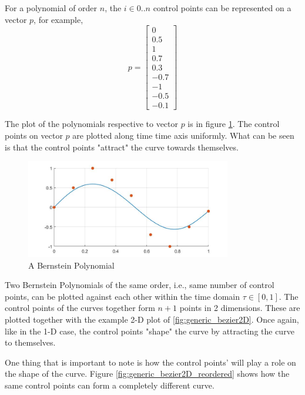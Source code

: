 \par For a polynomial of order $n$, the $i \in {0 .. n}$ control points can be represented on a vector $p$, for example,
\begin{equation}
    p = \begin{bmatrix}0\\ 0.5\\ 1\\ 0.7\\ 0.3\\ -0.7\\ -1\\ -0.5\\ -0.1\end{bmatrix}
\end{equation}
\par The plot of the polynomials respective to vector $p$ is in figure \ref{fig:generic_bezier}. The control points on vector $p$ are plotted along time time axis uniformly. What can be seen is that the control points "attract" the curve towards themselves.

\begin{figure}[h!]
\centering
\includegraphics[width=0.8\textwidth]{Images/generic_bezier.jpg}
\caption{A Bernstein Polynomial}
\label{fig:generic_bezier}
\end{figure}


\par Two Bernstein Polynomials of the same order, i.e., same number of control points, can be plotted against each other within the time domain $\tau \in [0,1]$. The control points of the curves together form $n+1$ points in 2 dimensions. These are plotted together with the example 2-D plot of \ref{fig:generic_bezier2D}. Once again, like in the 1-D case, the control points "shape" the curve by attracting the curve to themselves.
\par One thing that is important to note is how the control points'  will play a role on the shape of the curve. Figure \ref{fig:generic_bezier2D_reordered} shows how the same control points can form a completely different curve.

